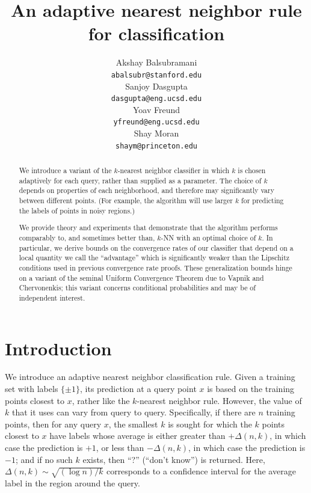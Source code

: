 \documentclass{article}
\title{An adaptive nearest neighbor rule for classification}
\author{
Akshay Balsubramani \\
\texttt{abalsubr@stanford.edu} \\
\And
Sanjoy Dasgupta \\
\texttt{dasgupta@eng.ucsd.edu} \\
\And
Yoav Freund \\
\texttt{yfreund@eng.ucsd.edu} \\
\And
Shay Moran\\
\texttt{shaym@princeton.edu} \\
}
\begin{document}
\maketitle

\begin{abstract}
We introduce a variant of the $k$-nearest neighbor classifier in which $k$ is chosen adaptively for each query, rather than supplied as a parameter. The choice of $k$ depends on properties of each neighborhood, and therefore may significantly vary between different points. (For example, the algorithm will use larger $k$ for predicting the labels of points in noisy regions.)  

We provide theory and experiments that demonstrate that the algorithm performs comparably to, and sometimes better than, $k$-NN with an optimal choice of $k$. In particular, we derive bounds on the convergence rates of our classifier that depend on a local quantity we call the ``advantage'' which is significantly weaker than the Lipschitz conditions used in previous convergence rate proofs. These generalization bounds hinge on a variant of the seminal Uniform Convergence Theorem due to Vapnik and Chervonenkis; this variant concerns conditional probabilities and may be of independent interest. 
\end{abstract}

\section{Introduction}

We introduce an adaptive nearest neighbor classification rule. Given a
training set with labels $\{\pm 1\}$, its prediction at a query point $x$ is based on the training points closest to $x$, rather like
the $k$-nearest neighbor rule. However, the value of $k$ that it uses
can vary from query to query. Specifically, if there are $n$ training
points, then for any query $x$, the smallest $k$ is sought for which
the $k$ points closest to $x$ have labels whose average is either
greater than $+\Delta(n,k)$, in which case the prediction is $+1$, or
less than $- \Delta(n,k)$, in which case the prediction is $-1$; and
if no such $k$ exists, then ``?'' (``don't know'') is returned.  
Here, $\Delta(n,k) \sim \sqrt{(\log n)/k}$ corresponds to a confidence interval for the average label in the region around the query.
\end{document}
